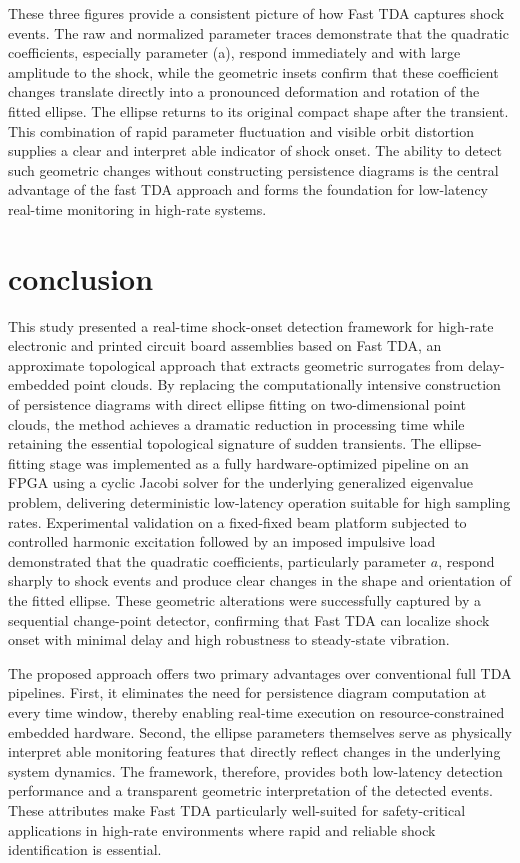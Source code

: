 \documentclass[colorlinks,upint,subscriptcorrection,varvw,hyphenate,balance,greek,russian,vietnamese,german]{asmeconf} %
\begin{document}
These three figures provide a consistent picture of how Fast TDA captures shock events. The raw and normalized parameter traces demonstrate that the quadratic coefficients, especially parameter (a), respond immediately and with large amplitude to the shock, while the geometric insets confirm that these coefficient changes translate directly into a pronounced deformation and rotation of the fitted ellipse. The ellipse returns to its original compact shape after the transient. This combination of rapid parameter fluctuation and visible orbit distortion supplies a clear and interpret able indicator of shock onset. The ability to detect such geometric changes without constructing persistence diagrams is the central advantage of the fast TDA approach and forms the foundation for low-latency real-time monitoring in high-rate systems.




\section{conclusion}


This study presented a real-time shock-onset detection framework for high-rate electronic and printed circuit board assemblies based on Fast TDA, an approximate topological approach that extracts geometric surrogates from delay-embedded point clouds. By replacing the computationally intensive construction of persistence diagrams with direct ellipse fitting on two-dimensional point clouds, the method achieves a dramatic reduction in processing time while retaining the essential topological signature of sudden transients. The ellipse-fitting stage was implemented as a fully hardware-optimized pipeline on an FPGA using a cyclic Jacobi solver for the underlying generalized eigenvalue problem, delivering deterministic low-latency operation suitable for high sampling rates. Experimental validation on a fixed-fixed beam platform subjected to controlled harmonic excitation followed by an imposed impulsive load demonstrated that the quadratic coefficients, particularly parameter \(a\), respond sharply to shock events and produce clear changes in the shape and orientation of the fitted ellipse. These geometric alterations were successfully captured by a sequential change-point detector, confirming that Fast TDA can localize shock onset with minimal delay and high robustness to steady-state vibration.

The proposed approach offers two primary advantages over conventional full TDA pipelines. First, it eliminates the need for persistence diagram computation at every time window, thereby enabling real-time execution on resource-constrained embedded hardware. Second, the ellipse parameters themselves serve as physically interpret able monitoring features that directly reflect changes in the underlying system dynamics. The framework, therefore, provides both low-latency detection performance and a transparent geometric interpretation of the detected events. These attributes make Fast TDA particularly well-suited for safety-critical applications in high-rate environments where rapid and reliable shock identification is essential.
\end{document}

